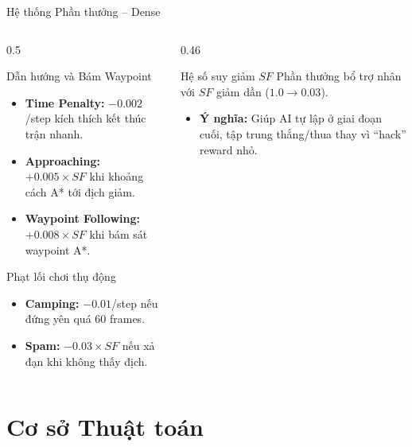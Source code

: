 \documentclass[aspectratio=169]{beamer}
\begin{document}
\begin{frame}{Hệ thống Phần thưởng -- Dense}
  \begin{columns}[T]
    \begin{column}{0.5\textwidth}
      \begin{block}{Dẫn hướng và Bám Waypoint}
        \scriptsize
        \begin{itemize}
          \item \textbf{Time Penalty:} $-0.002$/step kích thích kết thúc trận nhanh.
          \item \textbf{Approaching:} $+0.005 \times SF$ khi khoảng cách A* tới địch giảm.
          \item \textbf{Waypoint Following:} $+0.008 \times SF$ khi bám sát waypoint A*.
        \end{itemize}
      \end{block}
      \vspace{0.3em}
      \begin{alertblock}{Phạt lối chơi thụ động}
        \scriptsize
        \begin{itemize}
          \item \textbf{Camping:} $-0.01$/step nếu đứng yên quá 60 frames.
          \item \textbf{Spam:} $-0.03 \times SF$ nếu xả đạn khi không thấy địch.
        \end{itemize}
      \end{alertblock}
    \end{column}
    \begin{column}{0.46\textwidth}
      \begin{exampleblock}{Hệ số suy giảm $SF$}
        \small
        Phần thưởng bổ trợ nhân với $SF$ giảm dần ($1.0 \to 0.03$).
        \begin{itemize}
          \item \textbf{Ý nghĩa:} Giúp AI tự lập ở giai đoạn cuối, tập trung thắng/thua thay vì ``hack'' reward nhỏ.
        \end{itemize}
      \end{exampleblock}
    \end{column}
  \end{columns}
\end{frame}

\section{Cơ sở Thuật toán}
\end{document}
